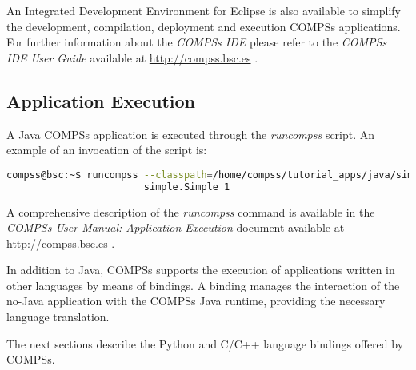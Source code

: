 An Integrated Development Environment for Eclipse is also available to simplify the development, compilation,
deployment and execution COMPSs applications. For further information about the \textit{COMPSs IDE} please refer to the \textit{COMPSs IDE
User Guide} available at \url{http://compss.bsc.es} .


\subsection{Application Execution}
A Java COMPSs application is executed through the \textit{runcompss} script. An example of an invocation of the script is:

\begin{lstlisting}[language=bash]
compss@bsc:~$ runcompss --classpath=/home/compss/tutorial_apps/java/simple/jar/simple.jar 
                        simple.Simple 1
\end{lstlisting}

A comprehensive description of the \textit{runcompss} command is available in the \textit{COMPSs User Manual: Application
Execution} document available at \url{http://compss.bsc.es} . 
\newline
~ \newline

In addition to Java, COMPSs supports the execution of applications written in other languages by 
means of bindings. A binding manages the interaction of the no-Java application with the COMPSs 
Java runtime, providing the necessary language translation.

The next sections describe the Python and C/C++ language bindings offered by COMPSs.
